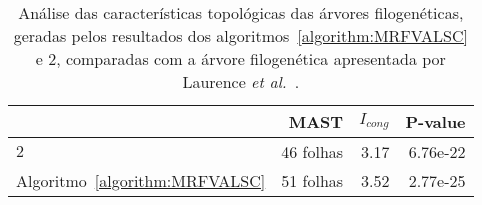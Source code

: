 \begin{table}[!htb]
  \caption{Análise das características topológicas das árvores filogenéticas, geradas pelos resultados dos algoritmos~\ref{algorithm:MRFVALSC} e $2$\SbRT{}, comparadas com a árvore filogenética apresentada por Laurence \textit {et al.}~\cite{garczarek2020cyanorak}.}
  \label{table:NRAGLYCG}
  \centering
  \begin{tabular}{|l|r|r|r|}
  \hline
                                     &                    MAST &              $I_{cong}$ &                 P-value \\ \hline
  $2$\SbRT{}                         &               46 folhas &                    3.17 &                6.76e-22 \\ \hline
  Algoritmo~\ref{algorithm:MRFVALSC} &               51 folhas &                    3.52 &                2.77e-25 \\ \hline
  \end{tabular}
\end{table}